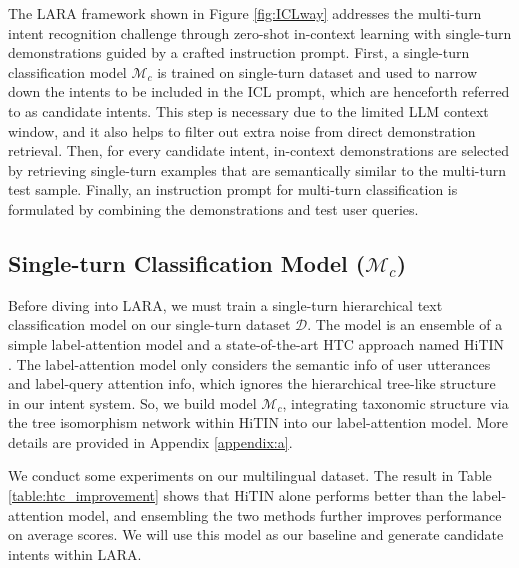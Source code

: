The LARA framework shown in Figure \ref{fig:ICLway} addresses the multi-turn intent recognition challenge through zero-shot in-context learning with single-turn demonstrations guided by a crafted instruction prompt. First, a single-turn classification model $\mathcal{M}_c$ is trained on single-turn dataset and used to narrow down the intents to be included in the ICL prompt, which are henceforth referred to as candidate intents. This step is necessary due to the limited LLM context window, and it also helps to filter out extra noise from direct demonstration retrieval. Then, for every candidate intent, in-context demonstrations are selected by retrieving single-turn examples that are semantically similar to the multi-turn test sample. Finally, an instruction prompt for multi-turn classification is formulated by combining the demonstrations and test user queries.


\subsection{Single-turn Classification Model ($\mathcal{M}_c$)}
Before diving into LARA, we must train a single-turn hierarchical text classification model on our single-turn dataset $\mathcal{D}$. The model is an ensemble of a simple label-attention model \cite{zhang2020multi} and a state-of-the-art HTC approach named HiTIN \cite{Zhu2023HiTINHT}. The label-attention model only considers the semantic info of user utterances and label-query attention info, which ignores the hierarchical tree-like structure in our intent system. So, we build model $\mathcal{M}_c$, integrating taxonomic structure via the tree isomorphism network within HiTIN into our label-attention model. More details are provided in Appendix \ref{appendix:a}.

We conduct some experiments on our multilingual dataset. The result in Table \ref{table:htc_improvement} shows that HiTIN alone performs better than the label-attention model, and ensembling the two methods further improves performance on average scores. We will use this model as our baseline and generate candidate intents within LARA.


